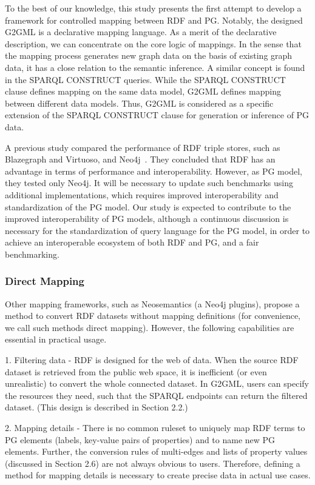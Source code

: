 \documentclass[runningheads]{llncs}
\begin{document}
To the best of our knowledge, this study presents the first attempt to develop a framework for controlled mapping between RDF and PG. 
Notably, the designed G2GML is a declarative mapping language. 
As a merit of the declarative description, we can concentrate on the core logic of mappings. In the sense that the mapping process generates new graph data on the basis of existing graph data, it has a close relation to the semantic inference. A similar concept is found in the SPARQL CONSTRUCT queries. While the SPARQL CONSTRUCT clause defines mapping on the same data model, G2GML defines mapping between different data models. 
Thus, G2GML is considered as a specific extension of the SPARQL CONSTRUCT clause for generation or inference of PG data.

A previous study compared the performance of RDF triple stores, such as Blazegraph and Virtuoso, and Neo4j~\cite{alocci}. They concluded that RDF has an advantage in terms of performance and interoperability. However, as PG model, they tested only Neo4j. It will be necessary to update such benchmarks using additional implementations, which requires improved interoperability and standardization of the PG model. Our study is expected to contribute to the improved interoperability of PG models, although a continuous discussion is necessary for the standardization of query language for the PG model, in order to achieve an interoperable ecosystem of both RDF and PG, and a fair benchmarking.


\subsubsection{Direct Mapping}

Other mapping frameworks, such as Neosemantics (a Neo4j plugins), propose a method to convert RDF datasets without mapping definitions (for convenience, we call such methods direct mapping). However, the following capabilities are essential in practical usage.

1. Filtering data - RDF is designed for the web of data. When the source RDF dataset is retrieved from the public web space, it is inefficient (or even unrealistic) to convert the whole connected dataset. In G2GML, users can specify the resources they need, such that the SPARQL endpoints can return the filtered dataset. (This design is described in Section 2.2.)

2. Mapping details - There is no common ruleset to uniquely map RDF terms to PG elements (labels, key-value pairs of properties) and to name new PG elements. Further, the conversion rules of multi-edges and lists of property values (discussed in Section 2.6) are not always obvious to users. Therefore, defining a method for mapping details is necessary to create precise data in actual use cases.
\end{document}
